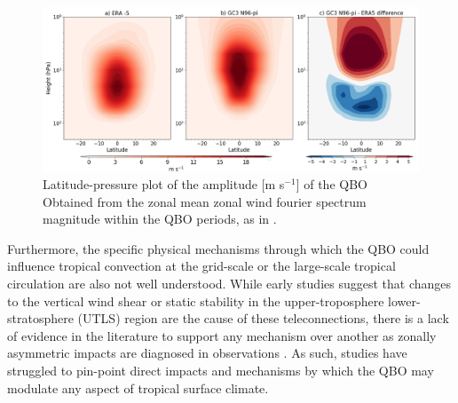  
\begin{figure}[t!]
\centering
 \includegraphics[width=\linewidth]{figures/qboamplitude.png}
\caption[QBO amplitude bias]{Latitude-pressure plot of the amplitude [m s$^{-1}$] of the QBO  Obtained from the zonal mean zonal wind fourier spectrum magnitude within the QBO periods, as in \cite{schenzinger2017}. }
\label{fig:qboamplitude}
\end{figure} 

Furthermore, the specific physical mechanisms through which the QBO could influence tropical convection at the grid-scale or the large-scale tropical circulation are also not well understood. 
While early studies \citep{gray1984,collimore2003} suggest that changes to the vertical wind shear or static stability in the upper-troposphere lower-stratosphere (UTLS) region are the cause of these teleconnections, there is a lack of evidence in the literature to support any mechanism over another as zonally asymmetric impacts are diagnosed in observations \citep{hitchman2021observational}. 
As such, studies have struggled to pin-point direct impacts and mechanisms by which the QBO may modulate any aspect of tropical surface climate. 

  
